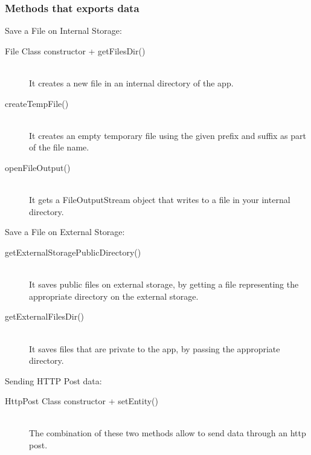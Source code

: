 \documentclass[letterpaper,twocolumn,10pt]{article}
\begin{document}
\subsubsection{Methods that exports data}
\noindent Save a File on Internal Storage:
\begin{description}
\item[{File Class constructor + getFilesDir()}] \hfill \\It creates a new file in an internal directory of the app.
\item[{createTempFile()}] \hfill \\It creates an empty temporary file using the given prefix and suffix as part of the file name.
\item[{openFileOutput()}] \hfill \\It gets a FileOutputStream object that writes to a file in your internal directory.
\end{description}

\noindent Save a File on External Storage:
\begin{description}
\item[{getExternalStoragePublicDirectory()}] \hfill \\It saves public files on external storage, by getting a file representing the appropriate directory on the external storage.
\item[{getExternalFilesDir()}] \hfill \\It saves files that are private to the app, by passing the appropriate directory.
\end{description}

\noindent Sending HTTP Post data:
\begin{description}
\item[{HttpPost Class constructor + setEntity()}] \hfill \\The combination of these two methods allow to send data through an http post.
\end{description}

\end{document}
